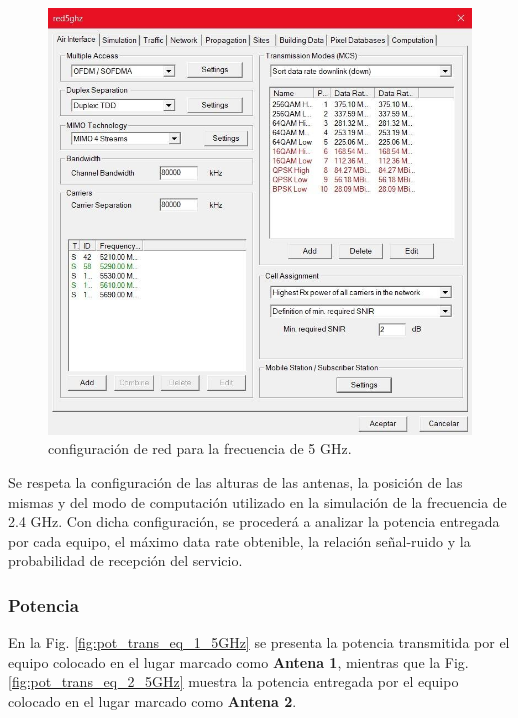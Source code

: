 \documentclass[11pt,a4paper]{article}
\begin{document}
\begin{figure}[htbp]
  \centering
  \includegraphics[width=0.5\linewidth]{fotos_ema/conf_red_5.jpg}
  \caption{configuración de red para la frecuencia de 5 GHz.}
  \label{fig:conf_red_5}
\end{figure}


Se respeta la configuración de las alturas de las antenas, la posición de las mismas y del modo de computación utilizado en la simulación de la frecuencia de 2.4 GHz. 
Con dicha configuración, se procederá a analizar la potencia entregada por cada equipo, el máximo data rate obtenible, la relación señal-ruido y la probabilidad de recepción del servicio. 


\subsubsection{Potencia}

En la Fig. \ref{fig:pot_trans_eq_1_5GHz} se presenta la potencia transmitida por el equipo colocado en el lugar marcado como \textbf{Antena 1}, mientras que la Fig. \ref{fig:pot_trans_eq_2_5GHz} muestra la potencia entregada por el equipo colocado en el lugar marcado como \textbf{Antena 2}.
\end{document}
